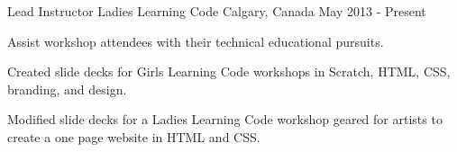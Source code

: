 \begin{cventries}
  \cventry
    {Lead Instructor}
    {Ladies Learning Code}
    {Calgary, Canada}
    {May 2013 - Present}
    {
      \begin{cvitems}
        \item {Assist workshop attendees with their technical educational pursuits.}
        \item {Created slide decks for Girls Learning Code workshops in Scratch, HTML, CSS, branding, and design.}
        \item {Modified slide decks for a Ladies Learning Code workshop geared for artists to create a one page website in HTML and CSS.}
      \end{cvitems}
    }
\end{cventries}
